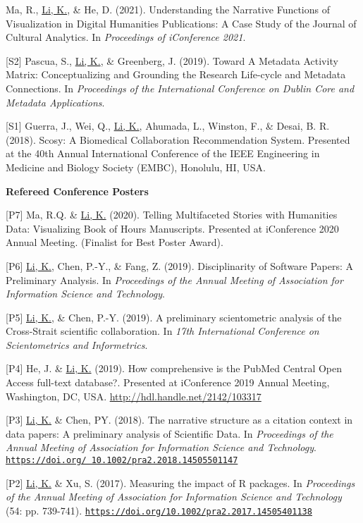 \documentclass[margin, 10pt]{res} %
\begin{document}
\begin{resume}
[S3] Ma, R., \underline{Li, K.}, \& He, D. (2021). Understanding the Narrative Functions of Visualization in Digital Humanities Publications: A Case Study of the Journal of Cultural Analytics. In \textit{Proceedings of iConference 2021}.

[S2] Pascua, S., \underline{Li, K.}, \& Greenberg, J. (2019). Toward A Metadata Activity Matrix: Conceptualizing and Grounding the Research Life-cycle and Metadata Connections. In \textit{Proceedings of the International Conference on Dublin Core and Metadata Applications}.

[S1] Guerra, J., Wei, Q., \underline{Li, K.}, Ahumada, L., Winston, F., \& Desai, B. R. (2018). Scosy: A Biomedical Collaboration Recommendation System. Presented at the 40th Annual International Conference of the IEEE Engineering in Medicine and Biology Society (EMBC), Honolulu, HI, USA.

\textbf{Refereed Conference Posters}

[P7] Ma, R.Q. \& \underline{Li, K.} (2020). Telling Multifaceted Stories with Humanities Data: Visualizing Book of Hours Manuscripts. Presented at iConference 2020 Annual Meeting. (Finalist for Best Poster Award).

[P6] \underline{Li, K.}, Chen, P.-Y., \& Fang, Z. (2019). Disciplinarity of Software Papers: A Preliminary Analysis. In \textit{Proceedings of the Annual Meeting of Association for Information Science and Technology}.

[P5] \underline{Li, K.}, \& Chen, P.-Y. (2019). A preliminary scientometric analysis of the Cross-Strait scientific collaboration. In \textit{17th International Conference on Scientometrics and Informetrics}.

[P4] He, J. \& \underline{Li, K.} (2019). How comprehensive is the PubMed Central Open Access full-text database?. Presented at iConference 2019 Annual Meeting, Washington, DC, USA. \href{http://hdl.handle.net/2142/103317}{http://hdl.handle.net/2142/103317}

[P3] \underline{Li, K.} \& Chen, PY. (2018). The narrative structure as a citation context in data papers: A preliminary analysis of Scientific Data. In \textit{Proceedings of the Annual Meeting of Association for Information Science and Technology}. \href{https://doi.org/10.1002/pra2.2018.14505501147}{\nolinkurl{https://doi.org/ 10.1002/pra2.2018.14505501147}}

[P2] \underline{Li, K.} \& Xu, S. (2017). Measuring the impact of R packages. In \textit{Proceedings of the Annual Meeting of Association for Information Science and Technology} (54: pp. 739-741). \href{https://doi.org/10.1002/pra2.2017.14505401138}{\nolinkurl{https://doi.org/10.1002/pra2.2017.14505401138}}


\end{resume}
\end{document}
